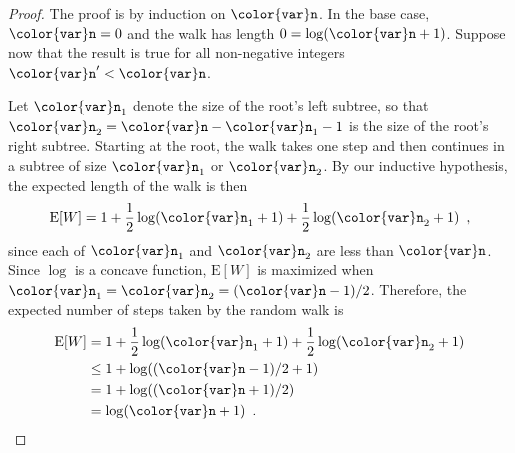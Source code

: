 \documentclass[10pt]{book}
\theoremstyle{plain}
\theoremstyle{definition}
\newcommand{\E}{\mathrm{E}}
\begin{document}
\begin{proof}
The proof is by induction on \ensuremath{\mathtt{{\color{var}n}}}. In the base case, $\ensuremath{\mathtt{{\color{var}n}}}=0$ and the walk
has length $0=\log (\ensuremath{\mathtt{{\color{var}n}}}+1)$.  Suppose now that the result is true for
all non-negative integers $\ensuremath{\mathtt{{\color{var}n}}}'< \ensuremath{\mathtt{{\color{var}n}}}$.

Let $\ensuremath{\mathtt{{\color{var}n}}}_1$ denote the size of the root's left subtree, so that
$\ensuremath{\mathtt{{\color{var}n}}}_2=\ensuremath{\mathtt{{\color{var}n}}}-\ensuremath{\mathtt{{\color{var}n}}}_1-1$ is the size of the root's right subtree.  Starting at
the root, the walk takes one step and then continues in a subtree of
size $\ensuremath{\mathtt{{\color{var}n}}}_1$ or $\ensuremath{\mathtt{{\color{var}n}}}_2$.  By our inductive hypothesis, the expected
length of the walk is then
\[
    \E[W] = 1 + \frac{1}{2}\log (\ensuremath{\mathtt{{\color{var}n}}}_1+1) + \frac{1}{2}\log (\ensuremath{\mathtt{{\color{var}n}}}_2+1)  \enspace , 
\] 
since each of $\ensuremath{\mathtt{{\color{var}n}}}_1$ and $\ensuremath{\mathtt{{\color{var}n}}}_2$ are less than $\ensuremath{\mathtt{{\color{var}n}}}$.  Since $\log$
is a concave function, $\E[W]$ is maximized when $\ensuremath{\mathtt{{\color{var}n}}}_1=\ensuremath{\mathtt{{\color{var}n}}}_2=(\ensuremath{\mathtt{{\color{var}n}}}-1)/2$.
Therefore,
 the expected number of steps taken by the random walk is 
\begin{align*}
    \E[W] 
    & = 1 + \frac{1}{2}\log (\ensuremath{\mathtt{{\color{var}n}}}_1+1) + \frac{1}{2}\log (\ensuremath{\mathtt{{\color{var}n}}}_2+1) \\
   & \le  1 + \log ((\ensuremath{\mathtt{{\color{var}n}}}-1)/2+1) \\
   & =  1 + \log ((\ensuremath{\mathtt{{\color{var}n}}}+1)/2) \\
   & =  \log (\ensuremath{\mathtt{{\color{var}n}}}+1)  \enspace . \qedhere 
\end{align*}
\end{proof}
\end{document}
